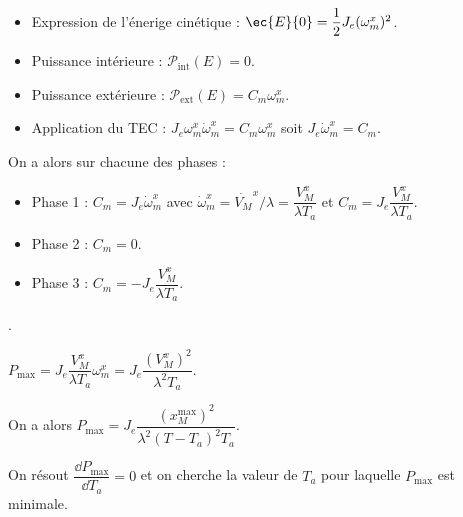 \ifprof
\begin{itemize}
\item Expression de l'énerige cinétique : $\ec{E}{0}=\dfrac{1}{2}J_e (\omega_m^x)^2$.
\item Puissance intérieure : $\mathcal{P}_{\text{int}}(E)=0$.
\item Puissance extérieure : $\mathcal{P}_{\text{ext}}(E)=C_m\omega_m^x$.
\item Application du TEC : $J_e \omega_m^x \dot{\omega}_m^x = C_m\omega_m^x$ soit $J_e  \dot{\omega}_m^x = C_m$.
\end{itemize}
\vspace{.25cm}

On a alors sur chacune des phases : 

\begin{itemize}
\item Phase 1 : $C_m=J_e  \dot{\omega}_m^x$ avec $\dot{\omega}_m^x = \dot{V_M}^x /  \lambda= \dfrac{V_M^x}{ \lambda T_a}$ et $C_m = J_e \dfrac{V_M^x}{\lambda T_a}$.
\item Phase 2 : $C_m=0$.
\item Phase 3 : $C_m = - J_e  \dfrac{V_M^x}{\lambda T_a}$.
\end{itemize}

\else
\fi

.
\ifprof
\else
\fi

\ifprof
$P_{\text{max}} = J_e \dfrac{V_M^x}{\lambda T_a}  {\omega}_m^x =J_e \dfrac{(V_M^x)^2}{\lambda^2 T_a}$.
\else
\fi

\ifprof
On a alors 
$P_{\text{max}} =J_e \dfrac{\left({x_M^{\text{max}}}\right)^2}{\lambda^2 \left({T-T_a}\right)^2 T_a}$.
\else
\fi

\ifprof
On résout $\dfrac{\dd P_{\text{max}}}{\dd T_a} = 0$ et on cherche la valeur de $T_a$ pour laquelle 
$P_{\text{max}}$ est minimale.

